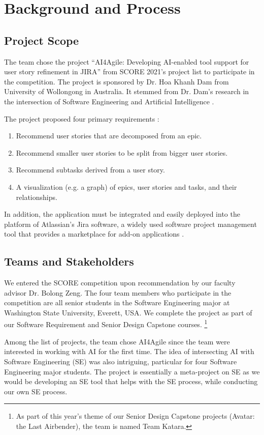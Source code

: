 \section{Background and Process}
\label{background}
\subsection{Project Scope}
\label{scope}
The team chose the project “AI4Agile: Developing AI-enabled tool support for user story refinement in JIRA” from SCORE 2021's project list to participate in the competition. The project is sponsored by Dr. Hoa Khanh Dam from University of Wollongong in Australia. It stemmed from Dr. Dam's research in the intersection of Software Engineering and Artificial Intelligence \cite{dam1,dam2,dam3}. 

The project proposed four primary requirements \cite{proposal}:

\begin{enumerate}
	\item Recommend user stories that are decomposed from an epic.
	\item Recommend smaller user stories to be split from bigger user stories.
	\item Recommend subtasks derived from a user story.
	\item A visualization (e.g. a graph) of epics, user stories and tasks, and their relationships.
\end{enumerate}

In addition, the application must be integrated and easily deployed into the platform of Atlassian’s Jira software, a widely used software project management tool that provides a marketplace for add-on applications \cite{jira1}. 

\subsection{Teams and Stakeholders}
We entered the SCORE competition upon recommendation by our faculty advisor Dr. Bolong Zeng. The four team members who participate in the competition are all senior students in the Software Engineering major at Washington State University, Everett, USA. We complete the project as part of our Software Requirement and Senior Design Capstone courses. \footnote{As part of this year's theme of our Senior Design Capstone projects (Avatar: the Last Airbender), the team is named Team Katara.} 

Among the list of projects, the team chose AI4Agile since the team were interested in working with AI for the first time. The idea of intersecting AI with Software Engineering (SE) was also intriguing, particular for four Software Engineering major students. The project is essentially a meta-project on SE as we would be developing an SE tool that helps with the SE process, while conducting our own SE process. 

